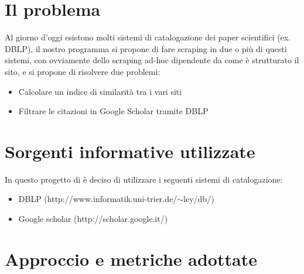 \documentclass[12pt]{article}
\begin{document}
\maketitle

\section{Il problema}
Al giorno d'oggi esistono molti sistemi di catalogazione dei paper scientifici (ex. DBLP), il nostro programma si propone di fare scraping in due o pi\`u di questi sistemi, con ovviamente dello scraping ad-hoc dipendente da come \`e strutturato il sito, e si propone di risolvere due problemi:
\begin{itemize}
\item Calcolare un indice di similarit\`a tra i vari siti
\item Filtrare le citazioni in Google Scholar tramite DBLP
\end{itemize}

\section{Sorgenti informative utilizzate}
In questo progetto di \`e deciso di utilizzare i seguenti sistemi di catalogazione:
\begin{itemize}
\item DBLP (http://www.informatik.uni-trier.de/$\sim$ley/db/)
\item Google scholar (http://scholar.google.it/)
\end{itemize}

\section{Approccio e metriche adottate}
\end{document}

